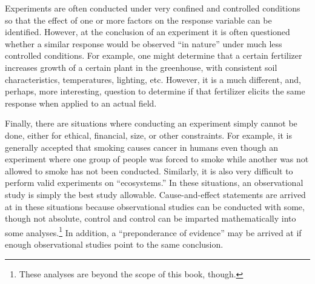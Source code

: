 \documentclass[10pt,openany]{book}\usepackage[]{graphicx}\usepackage[]{color}
\begin{document}
Experiments are often conducted under very confined and controlled conditions so that the effect of one or more factors on the response variable can be identified.  However, at the conclusion of an experiment it is often questioned whether a similar response would be observed ``in nature'' under much less controlled conditions.  For example, one might determine that a certain fertilizer increases growth of a certain plant in the greenhouse, with consistent soil characteristics, temperatures, lighting, etc.  However, it is a much different, and, perhaps, more interesting, question to determine if that fertilizer elicits the same response when applied to an actual field.

Finally, there are situations where conducting an experiment simply cannot be done, either for ethical, financial, size, or other constraints.  For example, it is generally accepted that smoking causes cancer in humans even though an experiment where one group of people was forced to smoke while another was not allowed to smoke has not been conducted.  Similarly, it is also very difficult to perform valid experiments on ``ecosystems.''  In these situations, an observational study is simply the best study allowable.  Cause-and-effect statements are arrived at in these situations because observational studies can be conducted with some, though not absolute, control and control can be imparted mathematically into some analyses.\footnote{These analyses are beyond the scope of this book, though.}  In addition, a ``preponderance of evidence'' may be arrived at if enough observational studies point to the same conclusion.
\end{document}
